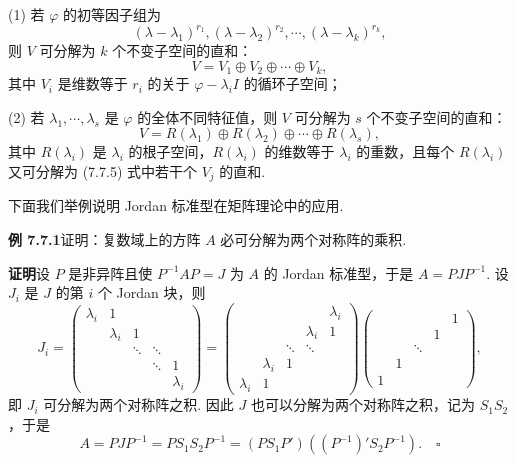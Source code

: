 \documentclass[UTF8,12pt,a4paper,fontset=fandol]{ctexart}
\begin{document}
(1) 若 $\varphi$ 的初等因子组为
\[
(\lambda-\lambda_1)^{r_1},(\lambda-\lambda_2)^{r_2},\cdots,(\lambda-\lambda_k)^{r_k},
\]
则 $V$ 可分解为 $k$ 个不变子空间的直和：
\begin{equation}
V=V_1\oplus V_2\oplus\cdots\oplus V_k,
\tag{7.7.5}
\end{equation}
其中 $V_i$ 是维数等于 $r_i$ 的关于 $\varphi-\lambda_iI$ 的循环子空间；

(2) 若 $\lambda_1,\cdots,\lambda_s$ 是 $\varphi$ 的全体不同特征值，则 $V$ 可分解为 $s$ 个不变子空间的直和：
\begin{equation}
V=R(\lambda_1)\oplus R(\lambda_2)\oplus\cdots\oplus R(\lambda_s),
\tag{7.7.6}
\end{equation}
其中 $R(\lambda_i)$ 是 $\lambda_i$ 的根子空间，$R(\lambda_i)$ 的维数等于 $\lambda_i$ 的重数，且每个 $R(\lambda_i)$ 又可分解为 (7.7.5) 式中若干个 $V_j$ 的直和.

下面我们举例说明 Jordan 标准型在矩阵理论中的应用.

\noindent\textbf{例 7.7.1}\quad 证明：复数域上的方阵 $A$ 必可分解为两个对称阵的乘积.

\noindent\textbf{证明}\quad 设 $P$ 是非异阵且使 $P^{-1}AP=J$ 为 $A$ 的 Jordan 标准型，于是 $A=PJP^{-1}$. 设 $J_i$ 是 $J$ 的第 $i$ 个 Jordan 块，则
\[
J_i=\left(\begin{array}{ccccc}
\lambda_i & 1 & & & \\
& \lambda_i & 1 & & \\
& & \ddots & \ddots & \\
& & & \ddots & 1\\
& & & & \lambda_i
\end{array}\right)
=\left(\begin{array}{ccccc}
& & & & \lambda_i\\
& & & \lambda_i & 1\\
& & \ddots & \ddots & \\
& \lambda_i & 1 & & \\
\lambda_i & 1 & & &
\end{array}\right)
\left(\begin{array}{ccccc}
& & & & 1\\
& & & 1 & \\
& & \ddots & & \\
& 1 & & & \\
1 & & & &
\end{array}\right),
\]
即 $J_i$ 可分解为两个对称阵之积. 因此 $J$ 也可以分解为两个对称阵之积，记为 $S_1S_2$，于是
\[
A=PJP^{-1}=PS_1S_2P^{-1}=(PS_1P')((P^{-1})'S_2P^{-1}).\quad \square
\]
\end{document}
